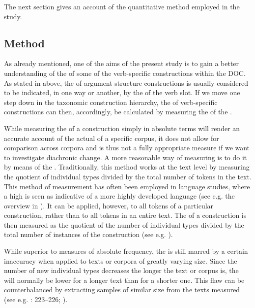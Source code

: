 \documentclass[output=paper]{langscibook}
\begin{document}
The next section gives an account of the quantitative method employed in the study.


\subsection{Method}\label{sec:valdeson:3.3}


As already mentioned, one of the aims of the present study is to gain a better understanding of the  of some of the verb-specific constructions within the DOC. As stated in  above, the  of argument structure constructions is usually considered to be indicated, in one way or another, by the  of the verb slot. If we move one step down in the taxonomic construction hierarchy, the  of verb-specific constructions can then, accordingly, be calculated by measuring the  of the .


\begin{sloppypar}
While measuring the  of a construction simply in absolute terms will render an accurate account of the actual  of a specific corpus, it does not allow for comparison across corpora and is thus not a fully appropriate measure if we want to investigate diachronic change. A more reasonable way of measuring  is to do it by means of the . Traditionally, this method works at the text level by measuring the quotient of individual types divided by the total number of tokens in the text. This method of measurement has often been employed in language  studies, where a high  is seen as indicative of a more highly developed language (see e.g. the overview in \citealt{Richards1987}). It can be applied, however, to all tokens of a particular construction, rather than to all tokens in an entire text. The  of a construction is then measured as the quotient of the number of individual types divided by the total number of instances of the construction (see e.g. \citealt{Olofsson2019}).
\end{sloppypar}



While superior to measures of absolute frequency, the  is still marred by a certain inaccuracy when applied to texts or corpora of greatly varying size. Since the number of new individual types decreases the longer the text or corpus is, the  will normally be lower for a longer text than for a shorter one. This flaw can be counterbalanced by extracting samples of similar size from the texts measured (see e.g. \citealt{Baayen2008}: 223–226; \citealt{CovingtonMcFall2010}).
\end{document}
